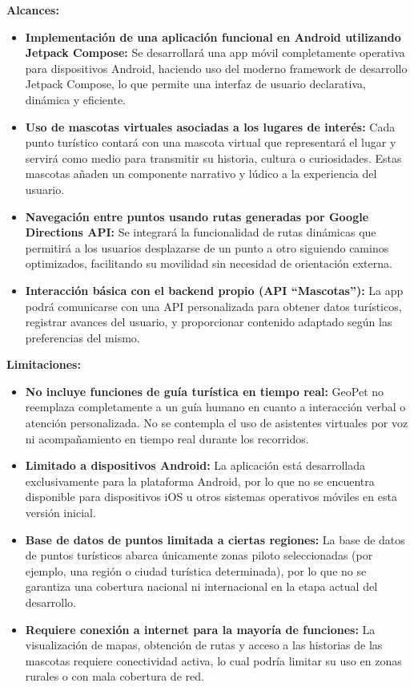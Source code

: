 \documentclass[12pt]{article}
\begin{document}
\textbf{Alcances:}
\begin{itemize}
    \item \textbf{Implementación de una aplicación funcional en Android utilizando Jetpack Compose:} 
    Se desarrollará una app móvil completamente operativa para dispositivos Android, haciendo uso del moderno framework de desarrollo Jetpack Compose, lo que permite una interfaz de usuario declarativa, dinámica y eficiente.

    \item \textbf{Uso de mascotas virtuales asociadas a los lugares de interés:} 
    Cada punto turístico contará con una mascota virtual que representará el lugar y servirá como medio para transmitir su historia, cultura o curiosidades. Estas mascotas añaden un componente narrativo y lúdico a la experiencia del usuario.

    \item \textbf{Navegación entre puntos usando rutas generadas por Google Directions API:} 
    Se integrará la funcionalidad de rutas dinámicas que permitirá a los usuarios desplazarse de un punto a otro siguiendo caminos optimizados, facilitando su movilidad sin necesidad de orientación externa.

    \item \textbf{Interacción básica con el backend propio (API “Mascotas”):} 
    La app podrá comunicarse con una API personalizada para obtener datos turísticos, registrar avances del usuario, y proporcionar contenido adaptado según las preferencias del mismo.
\end{itemize}

\textbf{Limitaciones:}
\begin{itemize}
    \item \textbf{No incluye funciones de guía turística en tiempo real:} 
    GeoPet no reemplaza completamente a un guía humano en cuanto a interacción verbal o atención personalizada. No se contempla el uso de asistentes virtuales por voz ni acompañamiento en tiempo real durante los recorridos.

    \item \textbf{Limitado a dispositivos Android:} 
    La aplicación está desarrollada exclusivamente para la plataforma Android, por lo que no se encuentra disponible para dispositivos iOS u otros sistemas operativos móviles en esta versión inicial.

    \item \textbf{Base de datos de puntos limitada a ciertas regiones:} 
    La base de datos de puntos turísticos abarca únicamente zonas piloto seleccionadas (por ejemplo, una región o ciudad turística determinada), por lo que no se garantiza una cobertura nacional ni internacional en la etapa actual del desarrollo.

    \item \textbf{Requiere conexión a internet para la mayoría de funciones:} 
    La visualización de mapas, obtención de rutas y acceso a las historias de las mascotas requiere conectividad activa, lo cual podría limitar su uso en zonas rurales o con mala cobertura de red.
\end{itemize}
\end{document}
